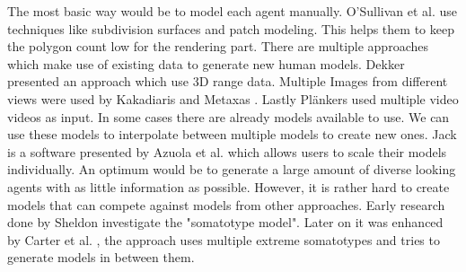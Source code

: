 \documentclass{acmsiggraph}               %
\begin{document}
The most basic way would be to model each agent manually. O’Sullivan et al.  use techniques like subdivision surfaces and patch modeling. This helps them to keep the polygon count low for the rendering part.
There are multiple approaches which make use of existing data to generate new human models. Dekker  presented an approach which use 3D range data. Multiple Images from different views were used by Kakadiaris and Metaxas . Lastly Plänkers  used multiple video videos as input.
In some cases there are already models available to use. We can use these models to interpolate between multiple models to create new ones. Jack is a software presented by Azuola et al.  which allows users to scale their models individually.
An optimum would be to generate a large amount of diverse looking agents with as little information as possible. However, it is rather hard to create models that can compete against models from other approaches. Early research done by Sheldon  investigate the "somatotype model". Later on it was enhanced by Carter et al. , the approach uses multiple extreme somatotypes and tries to generate models in between them.

\end{document}
